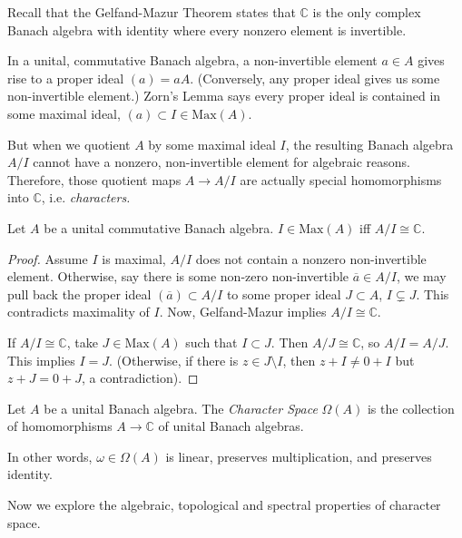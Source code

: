
Recall that the Gelfand-Mazur Theorem states that $\mathbb{C}$ is the only complex Banach algebra with identity where every nonzero element is invertible. 

In a unital, commutative Banach algebra, a non-invertible element $a \in A$ gives rise to a proper ideal $(a) = a A$. (Conversely, any proper ideal gives us some non-invertible element.) Zorn's Lemma says every proper ideal is contained in some maximal ideal,  $(a) \subset I \in \text{Max}(A)$.

But when we quotient $A$ by some maximal ideal $I$, the resulting Banach algebra $A / I$ cannot have a nonzero, non-invertible element for algebraic reasons. Therefore, those quotient maps $A \to A / I$ are actually special homomorphisms into $\mathbb{C}$, i.e. \textit{characters.}

\begin{proposition}
	\label{prop:MaximalQuotientIsC}
	Let $A $ be a unital commutative Banach algebra. $I \in \text{Max}(A)$ iff $A / I \cong \mathbb{C}$.
\end{proposition}
\begin{proof}
	Assume $I$ is maximal, $A / I$ does not contain a nonzero non-invertible element. Otherwise, say there is some non-zero non-invertible $\overline{a}  \in A / I$, we may pull back the proper ideal $(\overline{a} ) \subset A / I$ to some proper ideal $J \subset A$, $I \subsetneq J$. This contradicts maximality of  $I$.
	Now, Gelfand-Mazur implies $A / I \cong \mathbb{C}$.

	If $A / I \cong \mathbb{C}$, take $J \in \text{Max}(A)$ such that $I \subset J$. Then $A / J \cong \mathbb{C}$, so $A / I = A / J$. This implies $I = J$. (Otherwise, if there is $z \in J \setminus  I$, then $z + I \neq 0 + I$ but $z + J = 0 + J$, a contradiction).

\end{proof}

\begin{definition}
	\label{defn:CharacterSpace}
	Let $A$ be a unital Banach algebra. 
	The \textit{Character Space} $\Omega\left(A \right) $ 
	is the collection of homomorphisms $A \to \mathbb{C}$ of unital Banach algebras. 

	In other words, $\omega \in \Omega(A)$ is linear, preserves multiplication, and preserves identity.
\end{definition}

Now we explore the algebraic, topological and spectral properties of character space.

